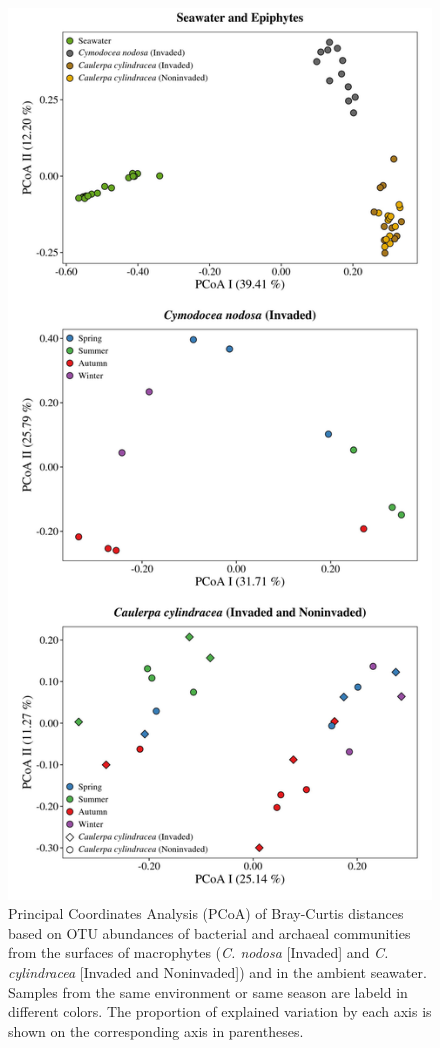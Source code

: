 \documentclass[12pt,]{article}
\begin{document}
\begin{figure}[H]

{\centering \includegraphics[width=0.55\linewidth]{../results/figures/pcoa_figure} 

}

\caption{Principal Coordinates Analysis (PCoA) of Bray-Curtis distances based on OTU abundances of bacterial and archaeal communities from the surfaces of macrophytes (\textit{C. nodosa} [Invaded] and \textit{C. cylindracea} [Invaded and Noninvaded]) and in the ambient seawater. Samples from the same environment or same season are labeld in different colors. The proportion of explained variation by each axis is shown on the corresponding axis in parentheses.\label{pcoa}}\label{fig:unnamed-chunk-3}
\end{figure}
\end{document}
